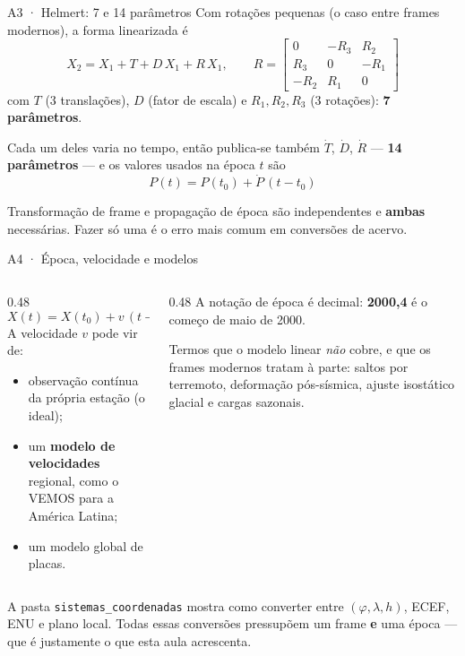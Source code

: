 \documentclass[aspectratio=169,11pt]{beamer}
\begin{document}
\begin{frame}{A3 · Helmert: 7 e 14 parâmetros}
  \small
  Com rotações pequenas (o caso entre frames modernos), a forma linearizada é
  \[
    X_2 = X_1 + T + D\,X_1 + R\,X_1,
    \qquad
    R = \begin{bmatrix} 0 & -R_3 & R_2 \\ R_3 & 0 & -R_1 \\ -R_2 & R_1 & 0 \end{bmatrix}
  \]
  com $T$ (3 translações), $D$ (fator de escala) e $R_1, R_2, R_3$ (3 rotações): \textbf{7
  parâmetros}.
  \medskip

  Cada um deles varia no tempo, então publica-se também $\dot T$, $\dot D$, $\dot R$ ---
  \textbf{14 parâmetros} --- e os valores usados na época $t$ são
  \[ P(t) = P(t_0) + \dot{P}\,(t - t_0) \]
  \begin{cuidado}[title={Ordem das operações}]
    Transformação de frame e propagação de época são independentes e \textbf{ambas}
    necessárias. Fazer só uma é o erro mais comum em conversões de acervo.
  \end{cuidado}
\end{frame}

\begin{frame}{A4 · Época, velocidade e modelos}
  \small
  \begin{columns}[T]
    \begin{column}{0.48\textwidth}
      \[ X(t) = X(t_0) + v\,(t - t_0) \]
      A velocidade $v$ pode vir de:
      \begin{itemize}
        \item observação contínua da própria estação (o ideal);
        \item um \textbf{modelo de velocidades} regional, como o VEMOS para a América
              Latina;
        \item um modelo global de placas.
      \end{itemize}
    \end{column}
    \begin{column}{0.48\textwidth}
      A notação de época é decimal: \textbf{2000,4} é o começo de maio de 2000.
      \medskip

      Termos que o modelo linear \emph{não} cobre, e que os frames modernos tratam à parte:
      saltos por terremoto, deformação pós-sísmica, ajuste isostático glacial e cargas
      sazonais.
    \end{column}
  \end{columns}
  \medskip
  \begin{ideia}[title={No simulador}]
    A pasta \texttt{sistemas\_coordenadas} mostra como converter entre $(\varphi, \lambda, h)$,
    ECEF, ENU e plano local. Todas essas conversões pressupõem um frame \textbf{e} uma época
    --- que é justamente o que esta aula acrescenta.
  \end{ideia}
\end{frame}
\end{document}
